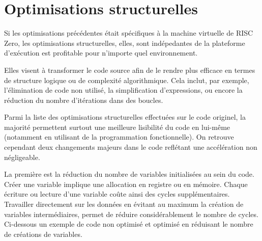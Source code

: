 \documentclass[12pt]{report}
\begin{document}
\break{}
\section{Optimisations structurelles}

Si les optimisations précédentes était spécifiques à la machine
virtuelle de RISC Zero, les optimisations structurelles, elles, sont
indépedantes de la plateforme d'exécution est profitable pour
n'importe quel environnement. 

\medskip

Elles visent à transformer le code source afin de le rendre plus
efficace en termes de structure logique ou de complexité
algorithmique. Cela inclut, par exemple, l'élimination de code non
utilisé, la simplification d'expressions, ou encore la réduction
du nombre d'itérations dans des boucles.

\medskip

Parmi la liste des optimisations structurelles effectuées sur 
le code originel, la majorité permettent surtout une meilleure 
lisibilité du code en lui-même (notamment en utilisant de la
programmation fonctionnelle). On retrouve cependant deux changements majeurs dans le code
reflétant une accélération non négligeable.

\medskip

La première est la réduction du nombre de variables initialisées
au sein du code. Créer une variable implique une allocation en 
registre ou en mémoire. Chaque écriture ou lecture d'une variable
coûte ainsi des cycles supplémentaires. Travailler directement
sur les données en évitant au maximum la création de variables 
intermédiaires, permet de réduire considérablement le nombre de cycles.
Ci-dessous un exemple de code non optimisé et optimisé en réduisant
le nombre de créations de variables.

\smallskip
\end{document}

